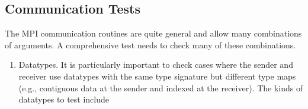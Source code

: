 \documentclass{article}
\begin{document}
\subsection{Communication Tests}
\label{sec:testing-comm}

The MPI communication routines are quite general and allow many
combinations of arguments.  A comprehensive test needs to check many
of these combinations.  

\begin{enumerate}

\item Datatypes. It is particularly important to check cases where the
sender and receiver use datatypes with the same type signature but 
different type maps (e.g., contiguous data at the sender and indexed
at the receiver).  The kinds of datatypes to test include


\end{enumerate}
\end{document}
